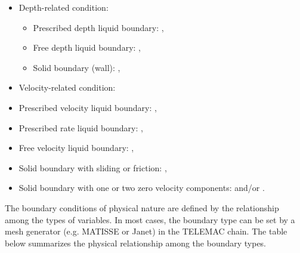 \begin{itemize}
\item Depth-related condition:

\begin{itemize}
\item Prescribed depth liquid boundary: ,

\item Free depth liquid boundary: ,

\item Solid boundary (wall): ,
\end{itemize}

\item Velocity-related condition:

\item Prescribed velocity liquid boundary: ,

\item Prescribed rate liquid boundary: ,

\item Free velocity liquid boundary: ,

\item Solid boundary with sliding or friction: ,

\item Solid boundary with one or two zero velocity components:  and/or
.
\end{itemize}

The boundary conditions of physical nature are defined by the relationship
among the types of variables. In most cases, the boundary type can be set by a
mesh generator (e.g. MATISSE or Janet) in the TELEMAC chain. The table
below summarizes the physical relationship among the boundary types.


